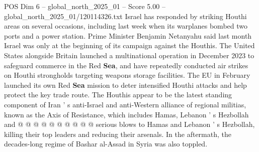 \begin{textsample}{POS Dim 6 – global\_north\_2025\_01 – Score 5.00 – global\_north\_2025\_01/120114326.txt}
Israel has responded by striking Houthi areas on several occasions, including last week when its warplanes bombed two ports and a power station.
Prime Minister Benjamin Netanyahu said last month Israel was only at the beginning of its campaign against the Houthis.
The United States alongside Britain launched a multinational operation in December 2023 to safeguard commerce in the Red \textbf{Sea}, and have repeatedly conducted air strikes on Houthi strongholds targeting weapons storage facilities.
The EU in February launched its own Red \textbf{Sea} mission to deter intensified Houthi attacks and help protect the key trade route.
The Houthis appear to be the latest standing component of Iran ' s anti-Israel and anti-Western alliance of regional militias, known as the Axis of Resistance, which includes Hamas, Lebanon ' s Hezbollah and @ @ @ @ @ @ @ @ @ @ serious blows to Hamas and Lebanon ' s Hezbollah, killing their top leaders and reducing their arsenals.
In the aftermath, the decades-long regime of Bashar al-Assad in Syria was also toppled.

\end{textsample}
